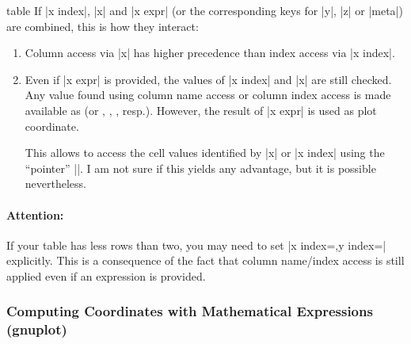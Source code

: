 \begin{addplotoperation}[]{table}{}
	If |x index|, |x| and |x expr| (or the corresponding keys for |y|, |z| or |meta|) are combined, this is how they interact:
	\begin{enumerate}
		\item Column access via |x| has higher precedence than index access via |x index|.
		\item Even if |x expr| is provided, the values of |x index| and |x| are still checked. Any value found using column name access or column index access is made available as  (or , , , resp.). However, the result of |x expr| is used as plot coordinate.

		This allows to access the cell values identified by |x| or |x index| using the ``pointer'' |\x|. I am not sure if this yields any advantage, but it is possible nevertheless.
	\end{enumerate}

	\paragraph{Attention:} If your table has less rows than two, you may need to set |x index={},y index={}| explicitly. This is a consequence of the fact that column name/index access is still applied even if an expression is provided.
\end{addplotoperation}

\subsubsection{Computing Coordinates with Mathematical Expressions (gnuplot)}

